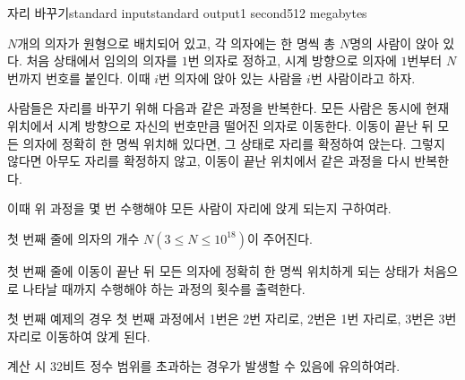 \begin{problem}{자리 바꾸기}{standard input}{standard output}{1 second}{512 megabytes}

$N$개의 의자가 원형으로 배치되어 있고, 각 의자에는 한 명씩 총 $N$명의 사람이 앉아 있다. 처음 상태에서 임의의 의자를 $1$번 의자로 정하고, 시계 방향으로 의자에 $1$번부터 $N$번까지 번호를 붙인다. 이때 $i$번 의자에 앉아 있는 사람을 $i$번 사람이라고 하자.

사람들은 자리를 바꾸기 위해 다음과 같은 과정을 반복한다. 모든 사람은 동시에 현재 위치에서 시계 방향으로 자신의 번호만큼 떨어진 의자로 이동한다. 이동이 끝난 뒤 모든 의자에 정확히 한 명씩 위치해 있다면, 그 상태로 자리를 확정하여 앉는다. 그렇지 않다면 아무도 자리를 확정하지 않고, 이동이 끝난 위치에서 같은 과정을 다시 반복한다.

이때 위 과정을 몇 번 수행해야 모든 사람이 자리에 앉게 되는지 구하여라.

\InputFile
첫 번째 줄에 의자의 개수 $N(3 \le N \le 10^{18})$이 주어진다.

\OutputFile
첫 번째 줄에 이동이 끝난 뒤 모든 의자에 정확히 한 명씩 위치하게 되는 상태가 처음으로 나타날 때까지 수행해야 하는 과정의 횟수를 출력한다.

\Examples

\begin{example}
%
%
\end{example}

\Note
첫 번째 예제의 경우 첫 번째 과정에서 1번은 2번 자리로, 2번은 1번 자리로, 3번은 3번 자리로 이동하여 앉게 된다.

계산 시 32비트 정수 범위를 초과하는 경우가 발생할 수 있음에 유의하여라.

\end{problem}